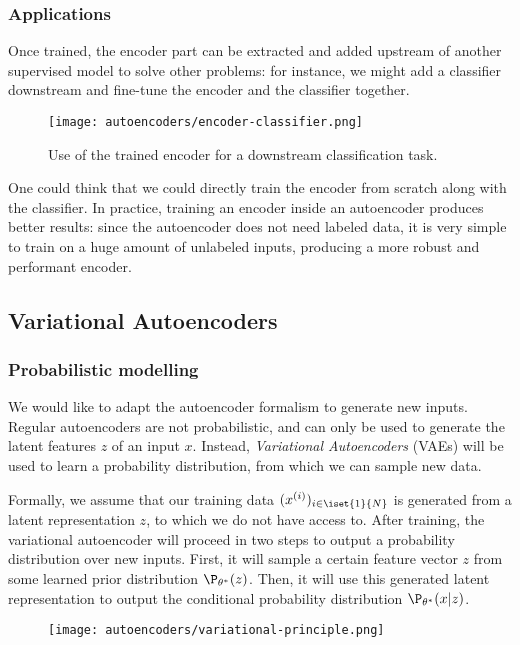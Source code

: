 \subsubsection{Applications}
Once trained, the encoder part can be extracted and added upstream of another supervised model to solve other problems: for instance, we might add a classifier downstream and fine-tune the encoder and the classifier together.
\begin{figure}[H]
    \centering
    \texttt{[image: autoencoders/encoder-classifier.png]}
    \caption{Use of the trained encoder for a downstream classification task.}
\end{figure}
One could think that we could directly train the encoder from scratch along with the classifier. In practice, training an encoder inside an autoencoder produces better results: since the autoencoder does not need labeled data, it is very simple to train on a huge amount of unlabeled inputs, producing a more robust and performant encoder.

\subsection{Variational Autoencoders}
\subsubsection{Probabilistic modelling}
We would like to adapt the autoencoder formalism to generate new inputs. Regular autoencoders are not probabilistic, and can only be used to generate the latent features $z$ of an input $x$. Instead, \emph{Variational Autoencoders} (VAEs) will be used to learn a probability distribution, from which we can sample new data.

Formally, we assume that our training data $(x^{(i)})_{i\in\iset{1}{N}}$ is generated from a latent representation $z$, to which we do not have access to. After training, the variational autoencoder will proceed in two steps to output a probability distribution over new inputs. First, it will sample a certain feature vector $z$ from some learned prior distribution $\P_{\theta^*}(z)$. Then, it will use this generated latent representation to output the conditional probability distribution $\P_{\theta^*}(x|z)$.
\begin{figure}[H]
    \centering
    \texttt{[image: autoencoders/variational-principle.png]}
\end{figure}

